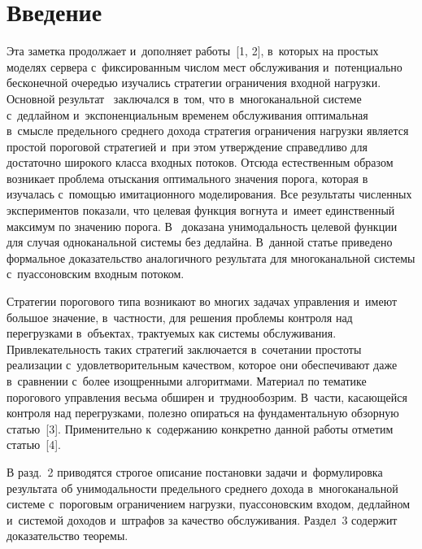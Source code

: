   



\thispagestyle{headings}

\begin{multicols}{2}

\label{st\stat}

  \section{Введение}
  
  Эта заметка продолжает и~дополняет работы~[1, 2], в~которых на простых 
моделях сервера с~фиксированным числом мест обслуживания и~потенциально 
бесконечной очередью изучались стратегии ограничения входной нагрузки. 
Основной результат~\cite{1-ag} за\-клю\-чал\-ся в~том, что в~многоканальной 
сис\-те\-ме с~дедлайном и~экспоненциальным временем обслуживания 
оптимальная в~смысле предельного среднего дохода стратегия ограничения 
нагрузки является прос\-той пороговой стратегией и~при этом утверж\-де\-ние 
справедливо для достаточно широкого класса входных потоков. Отсюда 
естественным образом возникает проблема отыскания оптимального значения 
порога, которая в~\cite{1-ag} изучалась с~по\-мощью имитационного 
моделирования. Все результаты чис\-лен\-ных экспериментов показали, что 
целевая функция вогнута и~имеет единственный максимум по значению порога. 
В~\cite{2-ag} доказана унимодальность целевой функции для случая 
одноканальной сис\-те\-мы без дед\-лай\-на. В~данной \mbox{статье} приведено формальное 
доказательство аналогичного результата для многоканальной сис\-те\-мы 
с~пуассоновским входным потоком.
  
  Стратегии порогового типа возникают во многих задачах управления 
  и~имеют большое значение, в~част\-ности, для решения проблемы контроля над 
перегрузками в~объектах, трактуемых как системы обслуживания. 
Привлекательность таких стратегий заключается в~сочетании простоты 
реализации с~удовлетворительным качеством, которое они обеспечивают даже 
в~сравнении с~более изощренными алгоритмами. Материал по тематике 
порогового управления весьма обширен и~труднообозрим. В~части, 
касающейся контроля над перегрузками, полезно опираться на 
фундаментальную обзорную статью~[3]. Применительно к~содержанию 
конкретно данной работы отметим статью~[4].
  
  В разд.~2 приводятся строгое описание постановки задачи и~формулировка 
результата об унимодальности предельного среднего дохода в~многоканальной 
системе с~пороговым ограничением нагрузки, пуассоновским входом, 
дедлайном и~сис\-те\-мой доходов и~штрафов за качество обслуживания. Раздел~3 
содержит доказательство тео\-ремы.


\end{multicols}

